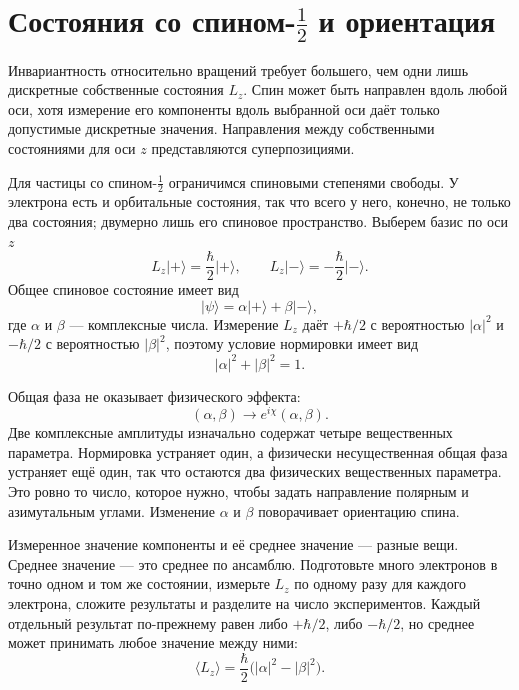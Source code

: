\section{Состояния со спином-\texorpdfstring{\(\tfrac12\)}{1/2} и ориентация}

Инвариантность относительно вращений требует большего, чем одни лишь дискретные собственные состояния \(L_z\). Спин может быть направлен вдоль любой оси, хотя измерение его компоненты вдоль выбранной оси даёт только допустимые дискретные значения. Направления между собственными состояниями для оси \(z\) представляются суперпозициями.

Для частицы со спином-\(\tfrac12\) ограничимся спиновыми степенями свободы. У электрона есть и орбитальные состояния, так что всего у него, конечно, не только два состояния; двумерно лишь его спиновое пространство. Выберем базис по оси \(z\)
\begin{equation}
L_z\lvert+\rangle=\frac{\hbar}{2}\lvert+\rangle,
\qquad
L_z\lvert-\rangle=-\frac{\hbar}{2}\lvert-\rangle.
\end{equation}
Общее спиновое состояние имеет вид
\begin{equation}
\lvert\psi\rangle
=
\alpha\lvert+\rangle+\beta\lvert-\rangle,
\end{equation}
где \(\alpha\) и \(\beta\) — комплексные числа. Измерение \(L_z\) даёт \(+\hbar/2\) с вероятностью \(|\alpha|^2\) и \(-\hbar/2\) с вероятностью \(|\beta|^2\), поэтому условие нормировки имеет вид
\begin{equation}
|\alpha|^2+|\beta|^2=1.
\end{equation}

Общая фаза не оказывает физического эффекта:
\begin{equation}
(\alpha,\beta)\longrightarrow
e^{i\chi}(\alpha,\beta).
\end{equation}
Две комплексные амплитуды изначально содержат четыре вещественных параметра. Нормировка устраняет один, а физически несущественная общая фаза устраняет ещё один, так что остаются два физических вещественных параметра. Это ровно то число, которое нужно, чтобы задать направление полярным и азимутальным углами. Изменение \(\alpha\) и \(\beta\) поворачивает ориентацию спина.

Измеренное значение компоненты и её среднее значение — разные вещи. Среднее значение — это среднее по ансамблю. Подготовьте много электронов в точно одном и том же состоянии, измерьте \(L_z\) по одному разу для каждого электрона, сложите результаты и разделите на число экспериментов. Каждый отдельный результат по-прежнему равен либо \(+\hbar/2\), либо \(-\hbar/2\), но среднее может принимать любое значение между ними:
\begin{equation}
\langle L_z\rangle
=
\frac{\hbar}{2}\bigl(|\alpha|^2-|\beta|^2\bigr).
\end{equation}

